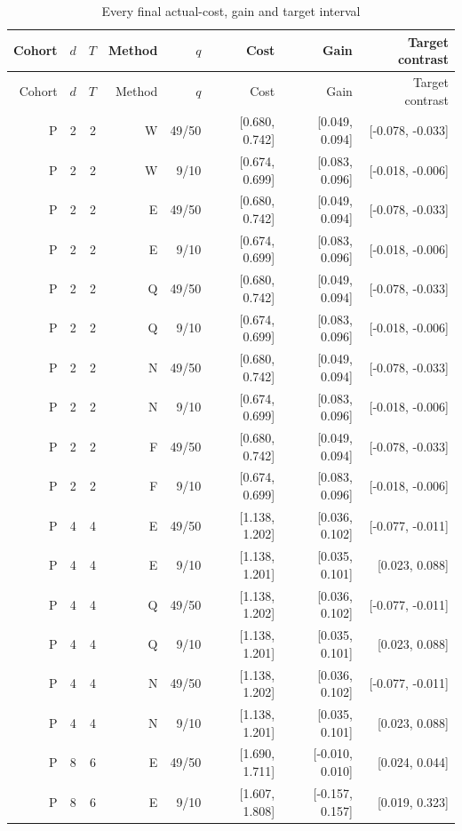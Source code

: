 \begingroup\small\setlength{\tabcolsep}{3pt}
\begin{longtable}{rrrrrrrr}
\caption{Every final actual-cost, gain and target interval}\label{tab:all-costs56}\\
\toprule
Cohort & $d$ & $T$ & Method & $q$ & Cost & Gain & Target contrast \\
\midrule\endfirsthead
\toprule
Cohort & $d$ & $T$ & Method & $q$ & Cost & Gain & Target contrast \\
\midrule\endhead
P & 2 & 2 & W & 49/50 & [0.680, 0.742] & [0.049, 0.094] & [-0.078, -0.033] \\
P & 2 & 2 & W & 9/10 & [0.674, 0.699] & [0.083, 0.096] & [-0.018, -0.006] \\
P & 2 & 2 & E & 49/50 & [0.680, 0.742] & [0.049, 0.094] & [-0.078, -0.033] \\
P & 2 & 2 & E & 9/10 & [0.674, 0.699] & [0.083, 0.096] & [-0.018, -0.006] \\
P & 2 & 2 & Q & 49/50 & [0.680, 0.742] & [0.049, 0.094] & [-0.078, -0.033] \\
P & 2 & 2 & Q & 9/10 & [0.674, 0.699] & [0.083, 0.096] & [-0.018, -0.006] \\
P & 2 & 2 & N & 49/50 & [0.680, 0.742] & [0.049, 0.094] & [-0.078, -0.033] \\
P & 2 & 2 & N & 9/10 & [0.674, 0.699] & [0.083, 0.096] & [-0.018, -0.006] \\
P & 2 & 2 & F & 49/50 & [0.680, 0.742] & [0.049, 0.094] & [-0.078, -0.033] \\
P & 2 & 2 & F & 9/10 & [0.674, 0.699] & [0.083, 0.096] & [-0.018, -0.006] \\
P & 4 & 4 & E & 49/50 & [1.138, 1.202] & [0.036, 0.102] & [-0.077, -0.011] \\
P & 4 & 4 & E & 9/10 & [1.138, 1.201] & [0.035, 0.101] & [0.023, 0.088] \\
P & 4 & 4 & Q & 49/50 & [1.138, 1.202] & [0.036, 0.102] & [-0.077, -0.011] \\
P & 4 & 4 & Q & 9/10 & [1.138, 1.201] & [0.035, 0.101] & [0.023, 0.088] \\
P & 4 & 4 & N & 49/50 & [1.138, 1.202] & [0.036, 0.102] & [-0.077, -0.011] \\
P & 4 & 4 & N & 9/10 & [1.138, 1.201] & [0.035, 0.101] & [0.023, 0.088] \\
P & 8 & 6 & E & 49/50 & [1.690, 1.711] & [-0.010, 0.010] & [0.024, 0.044] \\
P & 8 & 6 & E & 9/10 & [1.607, 1.808] & [-0.157, 0.157] & [0.019, 0.323] \\

\end{longtable}

